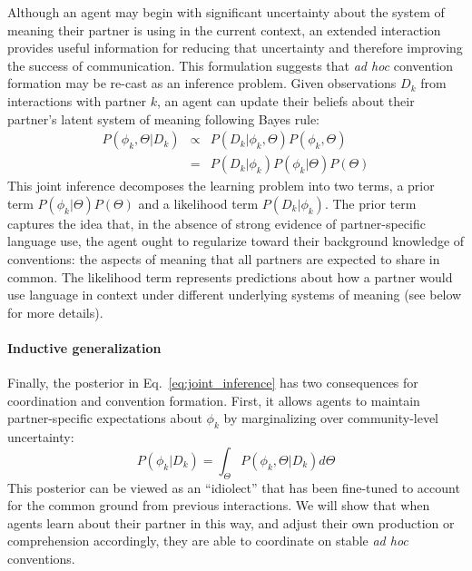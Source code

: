 Although an agent may begin with significant uncertainty about the system of meaning their partner is using in the current context, an extended interaction provides useful information for reducing that uncertainty and therefore improving the success of communication.
This formulation suggests that \emph{ad hoc} convention formation may be re-cast as an inference problem.
Given observations $D_k$ from interactions with partner $k$, an agent can update their beliefs about their partner's latent system of meaning following Bayes rule:
\begin{equation}
\begin{array}{rcl}
\label{eq:joint_inference}
P(\phi_k, \Theta | D_k)  & \propto &  P(D_k | \phi_k, \Theta) P(\phi_k, \Theta) \\
                           & =   & P(D_k | \phi_k) P(\phi_k | \Theta) P(\Theta)
\end{array}
\end{equation}
This joint inference decomposes the learning problem into two terms, a prior term $P(\phi_k | \Theta)P(\Theta)$ and a likelihood term $P(D_k | \phi_k)$.
The prior term captures the idea that, in the absence of strong evidence of partner-specific language use, the agent ought to regularize toward their background knowledge of conventions: the aspects of meaning that all partners are expected to share in common.
The likelihood term represents predictions about how a partner would use language in context under different underlying systems of meaning (see below for more details).

\paragraph{Inductive generalization}

Finally, the posterior in Eq.~\ref{eq:joint_inference} has two consequences for coordination and convention formation.
First, it allows agents to maintain partner-specific expectations about $\phi_k$ by marginalizing over community-level uncertainty:
\begin{equation}
P(\phi_k | D_k) =  \int_{\Theta}P(\phi_k, \Theta | D_k)  d\Theta
\end{equation}
This posterior can be viewed as an ``idiolect'' that has been fine-tuned to account for the common ground from previous interactions.
We will show that when agents learn about their partner in this way, and adjust their own production or comprehension accordingly, they are able to coordinate on stable \emph{ad hoc} conventions.

